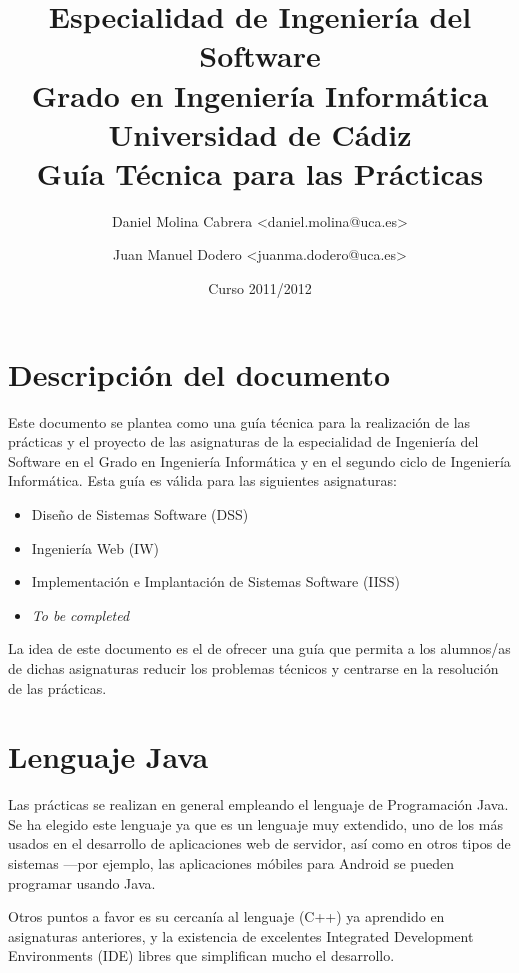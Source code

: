 \documentclass[11pt]{article}
\title{Especialidad de Ingeniería del Software\\ Grado en Ingeniería
Informática\\ Universidad de Cádiz\\ \textbf{Guía Técnica para las Prácticas}}
\author{Daniel Molina Cabrera <daniel.molina@uca.es> \and Juan Manuel Dodero
<juanma.dodero@uca.es>} \date{Curso 2011/2012}
\begin{document}
\maketitle


\setcounter{tocdepth}{2} \tableofcontents \vspace*{1cm} \newpage
\setlength{\parindent}{0pt} \setlength{\parskip}{1ex plus 0.5ex minus 0.2ex}


\section{Descripción del documento} \label{sec-1}



Este documento se plantea como una guía técnica para la realización de las
prácticas y el proyecto de las asignaturas de la especialidad de Ingeniería del
Software en el Grado en Ingeniería Informática y en el segundo ciclo de
Ingeniería Informática. Esta guía es válida para las siguientes asignaturas:

\begin{itemize}
\item Diseño de Sistemas Software (DSS)
\item Ingeniería Web (IW)
\item Implementación e Implantación de Sistemas Software (IISS)
\item \textit{To be completed}
\end{itemize}

La idea de este documento es el de ofrecer una guía que permita a los alumnos/as
de dichas asignaturas reducir los problemas técnicos y centrarse en la
resolución de las prácticas.


\section{Lenguaje Java} \label{sec-2} Las prácticas se realizan en general
empleando el lenguaje de Programación Java. Se ha elegido este lenguaje ya que
es un lenguaje muy extendido, uno de los más usados en el desarrollo de
aplicaciones web de servidor, así como en otros tipos de sistemas ---por
ejemplo, las aplicaciones móbiles para Android se pueden programar usando Java.

Otros puntos a favor es su cercanía al lenguaje (C++) ya aprendido en
asignaturas anteriores, y la existencia de excelentes Integrated Development
Environments (IDE) libres que simplifican mucho el desarrollo.
\end{document}
